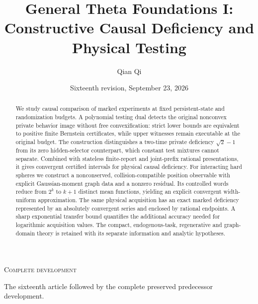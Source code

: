 
\newcommand{\Wone}{W_1}
\newcommand{\Del}{\Delta}
\newcommand{\emptyw}{\varnothing}
\newcommand{\osc}{\operatorname{osc}}
\newcommand{\diam}{\operatorname{diam}}
\newcommand{\Lipone}{\operatorname{Lip}_1}
\newcommand{\aff}{\operatorname{aff}}
\newcommand{\conv}{\operatorname{conv}}
\newcommand{\rplus}{\operatorname{rank}_{+}}
\newcommand{\dpr}{\delta^{\rm p}}
\newcommand{\dhi}{\delta^{\rm h}}
\newcommand{\dvi}{\delta^{\rm v}}
\newcommand{\dmix}{\delta^{\rm mix}}
\newcommand{\cK}{\mathcal K}
\newcommand{\cB}{\mathcal B}
\newcommand{\cI}{\mathcal I}
\title[General Theta Foundations I]{General Theta Foundations I:\\Constructive Causal Deficiency and Physical Testing}
\author{Qian Qi}
\date{Sixteenth revision, September 23, 2026}

\begin{abstract}
We study causal comparison of marked experiments at fixed persistent-state
and randomization budgets. A polynomial testing dual detects the original
nonconvex private behavior image without free convexification: strict
lower bounds are equivalent to positive finite Bernstein certificates,
while upper witnesses remain executable at the original budget.
The construction distinguishes a two-time private deficiency $\sqrt2-1$
from its zero hidden-selector counterpart, which constant test mixtures
cannot separate. Combined with stateless finite-report and joint-prefix
rational presentations, it gives convergent certified intervals for
physical causal deficiency. For interacting hard spheres we construct a
nonconserved, collision-compatible position observable with explicit
Gaussian-moment graph data and a nonzero residual. Its controlled words
reduce from $2^k$ to $k+1$ distinct mean functions, yielding an explicit
convergent width-uniform approximation. The same physical acquisition has
an exact marked deficiency represented by an absolutely convergent series
and enclosed by rational endpoints. A sharp exponential transfer bound
quantifies the additional accuracy needed for logarithmic acquisition
values. The compact, endogenous-task, regenerative and graph-domain
theory is retained with its separate information and analytic hypotheses.
\end{abstract}
\maketitle
\enlargethispage{4pt}
\ifcomplete
\begin{center}\small\textsc{Complete development}\par
The sixteenth article followed by the complete preserved predecessor development.
\end{center}
\fi
\tableofcontents
